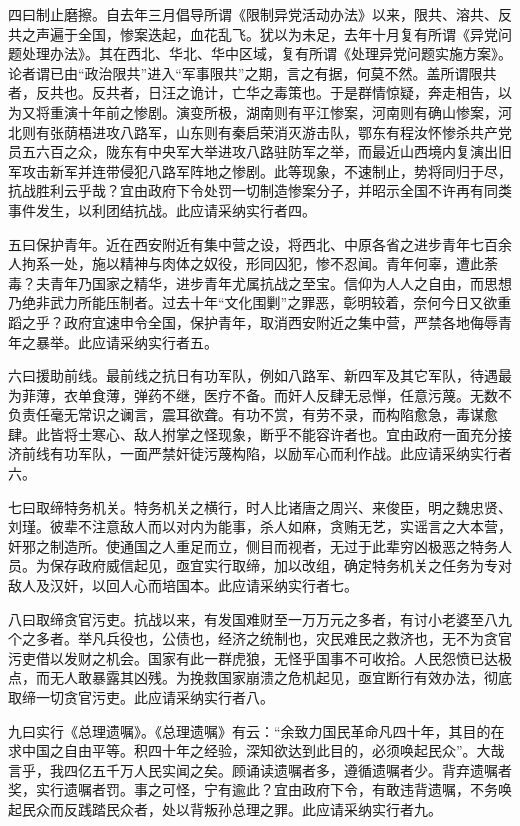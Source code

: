 四曰制止磨擦。自去年三月倡导所谓《限制异党活动办法》以来，限共、溶共、反共之声遍于全国，惨案迭起，血花乱飞。犹以为未足，去年十月复有所谓《异党问题处理办法》。其在西北、华北、华中区域，复有所谓《处理异党问题实施方案》。论者谓已由“政治限共”进入“军事限共”之期，言之有据，何莫不然。盖所谓限共者，反共也。反共者，日汪之诡计，亡华之毒策也。于是群情惊疑，奔走相告，以为又将重演十年前之惨剧。演变所极，湖南则有平江惨案，河南则有确山惨案，河北则有张荫梧进攻八路军，山东则有秦启荣消灭游击队，鄂东有程汝怀惨杀共产党员五六百之众，陇东有中央军大举进攻八路驻防军之举，而最近山西境内复演出旧军攻击新军并连带侵犯八路军阵地之惨剧。此等现象，不速制止，势将同归于尽，抗战胜利云乎哉？宜由政府下令处罚一切制造惨案分子，并昭示全国不许再有同类事件发生，以利团结抗战。此应请采纳实行者四。

五曰保护青年。近在西安附近有集中营之设，将西北、中原各省之进步青年七百余人拘系一处，施以精神与肉体之奴役，形同囚犯，惨不忍闻。青年何辜，遭此荼毒？夫青年乃国家之精华，进步青年尤属抗战之至宝。信仰为人人之自由，而思想乃绝非武力所能压制者。过去十年“文化围剿”之罪恶，彰明较着，奈何今日又欲重蹈之乎？政府宜速申令全国，保护青年，取消西安附近之集中营，严禁各地侮辱青年之暴举。此应请采纳实行者五。

六曰援助前线。最前线之抗日有功军队，例如八路军、新四军及其它军队，待遇最为菲薄，衣单食薄，弹药不继，医疗不备。而奸人反肆无忌惮，任意污蔑。无数不负责任毫无常识之谰言，震耳欲聋。有功不赏，有劳不录，而构陷愈急，毒谋愈肆。此皆将士寒心、敌人拊掌之怪现象，断乎不能容许者也。宜由政府一面充分接济前线有功军队，一面严禁奸徒污蔑构陷，以励军心而利作战。此应请采纳实行者六。

七曰取缔特务机关。特务机关之横行，时人比诸唐之周兴、来俊臣，明之魏忠贤、刘瑾。彼辈不注意敌人而以对内为能事，杀人如麻，贪贿无艺，实谣言之大本营，奸邪之制造所。使通国之人重足而立，侧目而视者，无过于此辈穷凶极恶之特务人员。为保存政府威信起见，亟宜实行取缔，加以改组，确定特务机关之任务为专对敌人及汉奸，以回人心而培国本。此应请采纳实行者七。

八曰取缔贪官污吏。抗战以来，有发国难财至一万万元之多者，有讨小老婆至八九个之多者。举凡兵役也，公债也，经济之统制也，灾民难民之救济也，无不为贪官污吏借以发财之机会。国家有此一群虎狼，无怪乎国事不可收拾。人民怨愤已达极点，而无人敢暴露其凶残。为挽救国家崩溃之危机起见，亟宜断行有效办法，彻底取缔一切贪官污吏。此应请采纳实行者八。

九曰实行《总理遗嘱》。《总理遗嘱》有云：“余致力国民革命凡四十年，其目的在求中国之自由平等。积四十年之经验，深知欲达到此目的，必须唤起民众”。大哉言乎，我四亿五千万人民实闻之矣。顾诵读遗嘱者多，遵循遗嘱者少。背弃遗嘱者奖，实行遗嘱者罚。事之可怪，宁有逾此？宜由政府下令，有敢违背遗嘱，不务唤起民众而反践踏民众者，处以背叛孙总理之罪。此应请采纳实行者九。

